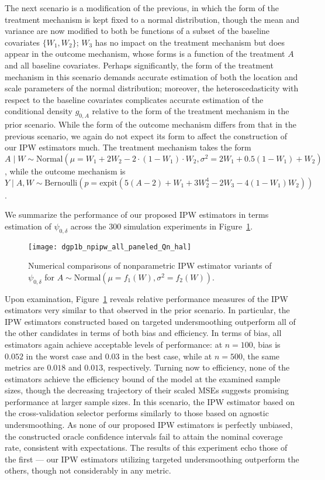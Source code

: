 The next scenario is a modification of the previous, in which the form of the
treatment mechanism is kept fixed to a normal distribution, though the mean and
variance are now modified to both be functions of a subset of the baseline
covariates $\{W_1, W_2\}$; $W_3$ has no impact on the treatment mechanism but
does appear in the outcome mechanism, whose forms is a function of the treatment
$A$ and all baseline covariates. Perhaps significantly, the form of the
treatment mechanism in this scenario demands accurate estimation of both the
location and scale parameters of the normal distribution; moreover, the
heteroscedasticity with respect to the baseline covariates complicates accurate
estimation of the conditional density $g_{0,A}$ relative to the form of the
treatment mechanism in the prior scenario. While the form of the outcome
mechanism differs from that in the previous scenario, we again do not expect its
form to affect the construction of our IPW estimators much. The treatment
mechanism takes the form $A \mid W \sim \text{Normal}\left(\mu = W_1 + 2 W_2
- 2 \cdot (1 - W_1) \cdot W_2, \sigma^2 = 2 W_1 + 0.5 (1 - W_1) + W_2 \right)$,
while the outcome mechanism is $Y \mid A, W \sim \text{Bernoulli}\left(p
= \text{expit}(5 (A - 2) + W_1 + 3 W_2^4 - 2 W_3 - \allowbreak 4 (1 - W_1)
W_2)\right)$.

We summarize the performance of our proposed IPW estimators in terms estimation
of $\psi_{0,\delta}$ across the $300$ simulation experiments in
Figure~\ref{fig:dgp1b_npipw}.
\begin{figure}[H]
  \centering
  \texttt{[image: dgp1b\_npipw\_all\_paneled\_Qn\_hal]}
  \caption{Numerical comparisons of nonparametric IPW estimator variants of
     $\psi_{0,\delta}$ for $A \sim \text{Normal}(\mu = f_1(W), \sigma^2 =
     f_2(W))$.}
  \label{fig:dgp1b_npipw}
\end{figure}
Upon examination, Figure~\ref{fig:dgp1b_npipw} reveals relative performance
measures of the IPW estimators very similar to that observed in the prior
scenario. In particular, the IPW estimators constructed based on targeted
undersmoothing outperform all of the other candidates in terms of both bias and
efficiency. In terms of bias, all estimators again achieve acceptable levels of
performance: at $n=100$, bias is $0.052$ in the worst case and $0.03$ in the
best case, while at $n=500$, the same metrics are $0.018$ and $0.013$,
respectively. Turning now to efficiency, none of the estimators achieve the
efficiency bound of the model at the examined sample sizes, though the
decreasing trajectory of their scaled MSEs suggests promising performance at
larger sample sizes. In this scenario, the IPW estimator based on the
cross-validation selector performs similarly to those based on agnostic
undersmoothing. As none of our proposed IPW estimators is perfectly unbiased,
the constructed oracle confidence intervals fail to attain the nominal coverage
rate, consistent with expectations. The results of this experiment echo those of
the first --- our IPW estimators utilizing targeted undersmoothing outperform
the others, though not considerably in any metric.

